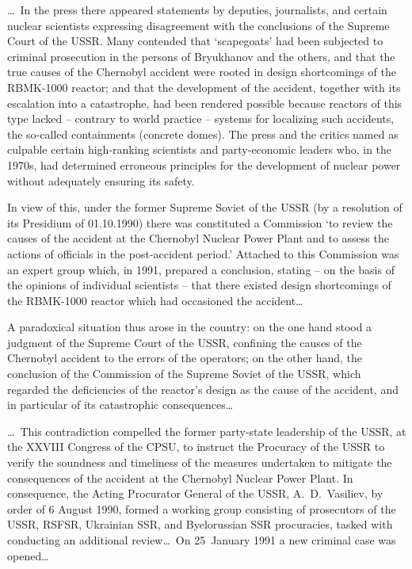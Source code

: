 \documentclass[openright]{bookest}
\begin{document}
\ldots~In the press there appeared statements by deputies, journalists, and certain nuclear scientists expressing disagreement with the conclusions of the Supreme Court of the USSR. Many contended that `scapegoats' had been subjected to criminal prosecution in the persons of Bryukhanov and the others, and that the true causes of the Chernobyl accident were rooted in design shortcomings of the RBMK-1000 reactor; and that the development of the accident, together with its escalation into a catastrophe, had been rendered possible because reactors of this type lacked -- contrary to world practice -- systems for localizing such accidents, the so-called containments (concrete domes). The press and the critics named as culpable certain high-ranking scientists and party-economic leaders who, in the 1970s, had determined erroneous principles for the development of nuclear power without adequately ensuring its safety.

In view of this, under the former Supreme Soviet of the USSR (by a resolution of its Presidium of 01.10.1990) there was constituted a Commission `to review the causes of the accident at the Chernobyl Nuclear Power Plant and to assess the actions of officials in the post-accident period.' Attached to this Commission was an expert group which, in 1991, prepared a conclusion, stating -- on the basis of the opinions of individual scientists -- that there existed design shortcomings of the RBMK-1000 reactor which had occasioned the accident\ldots

A paradoxical situation thus arose in the country: on the one hand stood a judgment of the Supreme Court of the USSR, confining the causes of the Chernobyl accident to the errors of the operators; on the other hand, the conclusion of the Commission of the Supreme Soviet of the USSR, which regarded the deficiencies of the reactor's design as the cause of the accident, and in particular of its catastrophic consequences\ldots

\ldots~This contradiction compelled the former party-state leadership of the USSR, at the XXVIII Congress of the CPSU, to instruct the Procuracy of the USSR to verify the soundness and timeliness of the measures undertaken to mitigate the consequences of the accident at the Chernobyl Nuclear Power Plant. In consequence, the Acting Procurator General of the USSR, A.~D.~Vasiliev, by order of 6 August 1990, formed a working group consisting of prosecutors of the USSR, RSFSR, Ukrainian SSR, and Byelorussian SSR procuracies, tasked with conducting an additional review\ldots~On 25~January 1991 a new criminal case was opened\ldots
\end{document}
